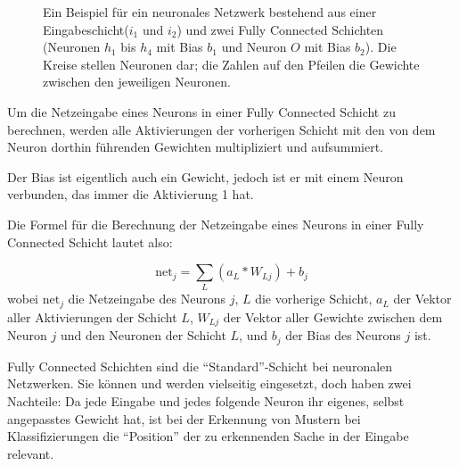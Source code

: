 \documentclass[10pt]{article}
\newcommand{\form}[1]{#1} %
\newcommand{\feng}[1]{{#1}}
\newcommand{\netin}{\textrm{net}}
\begin{document}
\begin{figure}
    
    \caption{Ein Beispiel für ein neuronales Netzwerk bestehend aus einer Eingabeschicht($i_1$ und $i_2$) und zwei Fully Connected Schichten (Neuronen $h_1$ bis $h_4$ mit Bias $b_1$ und Neuron $O$ mit Bias $b_2$). 
    Die Kreise stellen Neuronen dar; die Zahlen auf den Pfeilen die Gewichte zwischen den jeweiligen Neuronen.}
    \label{fig:dense_nn}
\end{figure}

Um die Netzeingabe eines Neurons in einer Fully Connected Schicht zu berechnen, werden alle Aktivierungen der vorherigen Schicht mit den von dem Neuron dorthin führenden Gewichten multipliziert und aufsummiert.

Der Bias ist eigentlich auch ein Gewicht, jedoch ist er mit einem Neuron verbunden, das immer die Aktivierung 1 hat. \cite{brotcrunsher:forwardpass}

Die Formel für die Berechnung der Netzeingabe eines Neurons in einer Fully Connected Schicht lautet also:

\form{\[
	\netin_j = \sum_{L} (a_{L} * W_{Lj}) + b_{j}
	\]}
\noindent wobei $\netin_j$ die Netzeingabe des Neurons $j$, $L$ die vorherige Schicht, $a_L$ der Vektor aller Aktivierungen der Schicht $L$, $W_{Lj}$ der Vektor aller Gewichte zwischen dem Neuron $j$ und den Neuronen der Schicht $L$, und $b_j$ der Bias des Neurons $j$ ist. 


Fully Connected Schichten sind die \enquote{Standard}-Schicht bei neuronalen Netzwerken. 
Sie können und werden vielseitig eingesetzt, doch haben zwei Nachteile: 
Da jede Eingabe und jedes folgende Neuron ihr eigenes, selbst angepasstes Gewicht hat, ist bei der Erkennung von Mustern bei Klassifizierungen die \enquote{Position} der zu erkennenden Sache in der Eingabe relevant.
\end{document}
